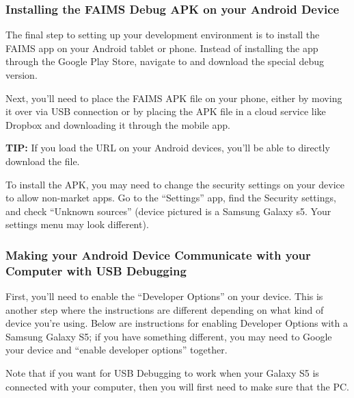 \subsubsection[installing-the-faims-debug-apk-on-your-android-device]{Installing the FAIMS Debug APK on your Android Device}

The final step to setting up your development environment is to install the FAIMS app on your Android tablet or phone. Instead of installing the app through the Google Play Store, navigate to \from[url15] and download the special debug version.

Next, you'll need to place the FAIMS APK file on your phone, either by moving it over via USB connection or by placing the APK file in a cloud service like Dropbox and downloading it through the mobile app.

{\bf TIP:} If you load the URL \from[url16] on your Android devices, you'll be able to directly download the file.

To install the APK, you may need to change the security settings on your device to allow non-market apps. Go to the “Settings” app, find the Security settings, and check “Unknown sources” (device pictured is a Samsung Galaxy s5. Your settings menu may look different).

{}

\subsubsection[making-your-android-device-communicate-with-your-computer-with-usb-debugging]{Making your Android Device Communicate with your Computer with USB Debugging}

First, you'll need to enable the “Developer Options” on your device. This is another step where the instructions are different depending on what kind of device you're using. Below are instructions for enabling Developer Options with a Samsung Galaxy S5; if you have something different, you may need to Google your device and “enable developer options” together.

Note that if you want for USB Debugging to work when your Galaxy S5 is connected with your computer, then you will first need to make sure that the \from[url17] PC.

